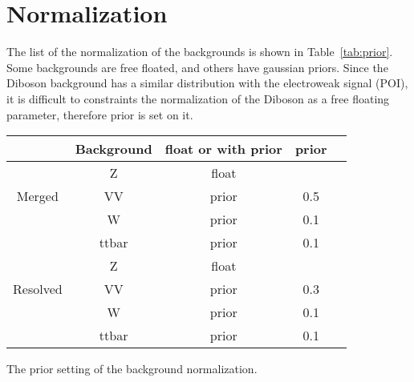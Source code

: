 \section{Normalization}
The list of the normalization of the backgrounds is shown in Table~\ref{tab:prior}.
Some backgrounds are free floated, and others have gaussian priors. Since the Diboson background has a similar distribution with the electroweak signal (POI), it is difficult to constraints the normalization of the Diboson as a free floating parameter, therefore prior is set on it.
\begin{center}
\begin{tabular}{ |c|c|c|c|c| } 
\hline
 & Background & float or with prior & prior \\
\hline
\multirow{3}{4em}{Merged} & Z & float &       \\ 
& VV                          & prior &   0.5 \\ 
& W                           & prior &   0.1 \\ 
& ttbar                       & prior &   0.1 \\ 
\hline
\multirow{3}{4em}{Resolved} & Z & float &       \\ 
& VV                          & prior &   0.3 \\ 
& W                           & prior &   0.1 \\ 
& ttbar                       & prior &   0.1 \\ 
\hline
\end{tabular}
\caption{\label{tab:prior} The prior setting of the background normalization. }
\end{center}

